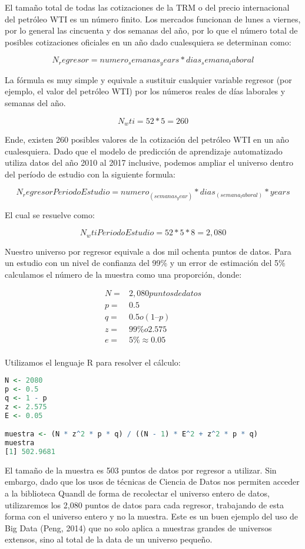 \begin{spacing}{1.5}
El tamaño total de todas las cotizaciones de la TRM o del precio internacional del petróleo WTI es un número finito. Los mercados funcionan de lunes a viernes, por lo general las cincuenta y dos semanas del año, por lo que el número total de posibles cotizaciones oficiales en un año dado cualesquiera se determinan como:

\[N_regresor=numero_semanas_years*dias_semana_laboral\]

La fórmula es muy simple y equivale a sustituir cualquier variable regresor (por ejemplo, el valor del petróleo WTI) por los números reales de días laborales y semanas del año. 

\[N_wti=52*5=260\]

Ende, existen 260 posibles valores de la cotización del petróleo WTI en un año cualesquiera. Dado que el modelo de predicción de aprendizaje automatizado utiliza datos del año 2010 al 2017 inclusive, podemos ampliar el universo dentro del período de estudio con la siguiente formula:

\[N_regresorPeriodoEstudio=numero_(semanas_year )*dias_(semana_laboral )*years\]

El cual se resuelve como:

\[N_wtiPeriodoEstudio=52*5*8=2,080\]

Nuestro universo por regresor equivale a dos mil ochenta puntos de datos. Para un estudio con un nivel de confianza del 99\% y un error de estimación del 5\% calculamos el número de la muestra como una proporción, donde:

\begin{align*}
  N =& 2,080 {puntos de datos} \\
  p =& 0.5 \\
  q =& 0.5 {o} (1 – p) \\
  z =& 99\% {o 2.575} \\
  e =& 5\% {\approx 0.05} \\
\end{align*}

Utilizamos el lenguaje R para resolver el cálculo:

\begin{lstlisting}[language=R]
N <- 2080
p <- 0.5
q <- 1 - p
z <- 2.575
E <- 0.05

muestra <- (N * z^2 * p * q) / ((N - 1) * E^2 + z^2 * p * q)
muestra
[1] 502.9681
\end{lstlisting}

El tamaño de la muestra es 503 puntos de datos por regresor a utilizar. Sin embargo, dado que los usos de técnicas de Ciencia de Datos nos permiten acceder a la biblioteca Quandl de forma de recolectar el universo entero de datos, utilizaremos los 2,080 puntos de datos para cada regresor, trabajando de esta forma con el universo entero y no la muestra. Este es un buen ejemplo del uso de Big Data (Peng, 2014) que no solo aplica a muestras grandes de universos extensos, sino al total de la data de un universo pequeño. 


\end{spacing}
